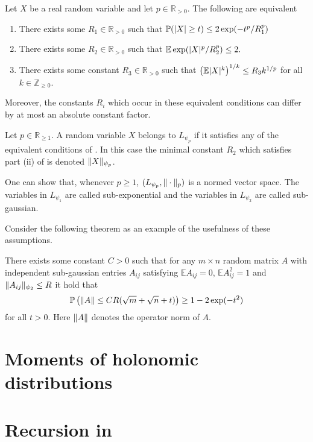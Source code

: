 \begin{theorem}{\cite[Proof of Proposition 2.5.2]{vershynin2018high}}\label{thm: EquivalentLp}
  Let $X$ be a real random variable and let $p\in \mathbb{R}_{>0}$. The following are equivalent
  \begin{enumerate}[label = (\roman*)]
    \item There exists some $R_1\in \mathbb{R}_{>0}$ such that $\mathbb{P}(\vert X \vert\geq t) \leq 2\exp(-t^p/R_1^p)$
    \item There exists some $R_2\in \mathbb{R}_{>0}$ such that $\mathbb{E}\exp(\vert X \vert^p/R_2^p) \leq 2.$
    \item There exists some constant $R_3\in \mathbb{R}_{>0}$ such that $\left(\mathbb{E} \vert X \vert^k \right)^{1/k} \leq R_3k^{1/p}$
    for all $k\in \mathbb{Z}_{\geq 0}$.
  \end{enumerate}
  Moreover, the constants $R_i$ which occur in these equivalent conditions can differ by at most an absolute constant factor.
\end{theorem}
\begin{definition}
  Let $p\in \mathbb{R}_{\geq 1}$.
  A random variable $X$ belongs to $L_{\psi_p}$ if it satisfies any of the equivalent conditions of .
  In this case the minimal constant $R_2$ which satisfies part (ii) of  is denoted $\Vert X \Vert_{\psi_p}$.
\end{definition}
\begin{remark}
  One can show that, whenever $p\geq 1$, $(L_{\psi_p},\Vert \cdot \Vert_p)$ is a normed vector space.
  The variables in $L_{\psi_1}$ are called sub-exponential and the variables in $L_{\psi_2}$ are called sub-gaussian.
\end{remark}
Consider the following theorem as an example of the usefulness of these assumptions.
\begin{theorem}{\cite[Theorem 4.4.5]{vershynin2018high}}
  There exists some constant $C>0$ such that for any  $m\times n$ random matrix $A$ with independent sub-gaussian entries $A_{ij}$ satisfying $\mathbb{E}A_{ij} = 0$, $\mathbb{E}A_{ij}^2 = 1$ and $\Vert A_{ij} \Vert_{\psi_2}\leq R$
  it hold that
  $$\mathbb{P}\left(\Vert A \Vert \leq  CR(\sqrt{m} + \sqrt{n} + t)\right) \geq 1-2\exp(-t^2)$$
  for all $t>0$.
  Here $\Vert A \Vert$ denotes the operator norm of $A$.
\end{theorem}

\section{Moments of holonomic distributions}\label{sec: RecursionMoment}

\section{Recursion in }

